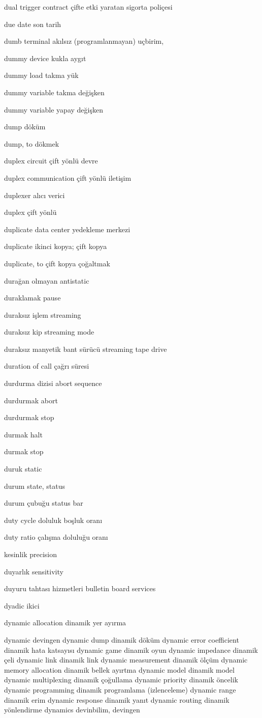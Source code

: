 \documentclass[12pt,fleqn]{article}\usepackage{../../common}
\begin{document}
dual trigger contract çifte etki yaratan sigorta poliçesi

due date son tarih

dumb terminal akılsız (programlanmayan) uçbirim,

dummy device kukla aygıt

dummy load takma yük

dummy variable takma değişken

dummy variable yapay değişken

dump döküm

dump, to dökmek

duplex circuit çift yönlü devre

duplex communication çift yönlü iletişim

duplexer alıcı verici

duplex çift yönlü

duplicate data center yedekleme merkezi

duplicate ikinci kopya; çift kopya

duplicate, to çift kopya çoğaltmak

durağan olmayan antistatic

duraklamak pause

duraksız işlem streaming

duraksız kip streaming mode

duraksız manyetik bant sürücü streaming tape drive

duration of call çağrı süresi

durdurma dizisi abort sequence

durdurmak abort

durdurmak stop

durmak halt

durmak stop

duruk static

durum state, status

durum çubuğu status bar

duty cycle doluluk boşluk oranı

duty ratio çalışma doluluğu oranı

kesinlik precision

duyarlık sensitivity

duyuru tahtası hizmetleri bulletin board services

dyadic ikici

dynamic allocation dinamik yer ayırma

dynamic devingen
dynamic dump dinamik döküm
dynamic error coefficient dinamik hata katsayısı
dynamic game dinamik oyun
dynamic impedance dinamik çeli
dynamic link dinamik link
dynamic measurement dinamik ölçüm
dynamic memory allocation dinamik bellek ayırtma
dynamic model dinamik model
dynamic multiplexing dinamik çoğullama
dynamic priority dinamik öncelik
dynamic programming dinamik programlama (izlenceleme)
dynamic range dinamik erim
dynamic response dinamik yanıt
dynamic routing dinamik yönlendirme
dynamics devinbilim, devingen
\end{document}
